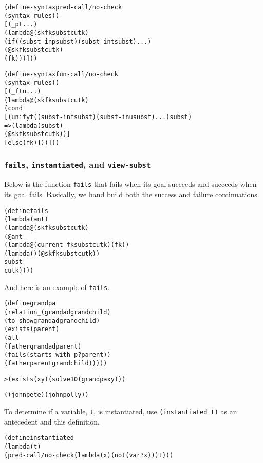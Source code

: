 \begin{alltt}
(define-syntax pred-call/no-check
  (syntax-rules ()
    [(_ p t ...)
     (lambda@ (sk fk subst cutk)
       (if ((subst-in p subst) (subst-in t subst) ...)
         (@ sk fk subst cutk)
         (fk)))]))

(define-syntax fun-call/no-check
  (syntax-rules ()
    [(_ f t u ...)
     (lambda@ (sk fk subst cutk)
       (cond
         [(unify t ((subst-in f subst) (subst-in u subst) ...) subst)
          => (lambda (subst)
               (@ sk fk subst cutk))]
         [else (fk)]))]))
\end{alltt}

\subsubsection{\texttt{fails}, \texttt{instantiated}, and \texttt{view-subst}}

Below is the function \texttt{fails} that fails when its goal succeeds and
succeeds when its goal fails.  Basically, we hand build both the success
and failure continuations.

\begin{alltt}
(define fails
  (lambda (ant)
    (lambda@ (sk fk subst cutk)
      (@ ant
        (lambda@ (current-fk subst cutk) (fk))
        (lambda () (@ sk fk subst cutk))
        subst 
        cutk))))
\end{alltt}
\noindent
And here is an example of \texttt{fails}.

\begin{alltt}
(define grandpa
  (relation _ (grandad grandchild)
    (to-show grandad grandchild)
    (exists (parent)
      (all
        (father grandad parent)
        (fails (starts-with-p? parent))
        (father parent grandchild)))))
\end{alltt}

\begin{alltt}
> (exists (x y) (solve 10 (grandpa x y)))

((john pete) (john polly))
\end{alltt}

To determine if a variable, \texttt{t}, is instantiated, use
\texttt{(instantiated t)} as an antecedent and this definition.

\begin{alltt}
(define instantiated
  (lambda (t)
    (pred-call/no-check (lambda (x) (not (var? x))) t)))
\end{alltt}

